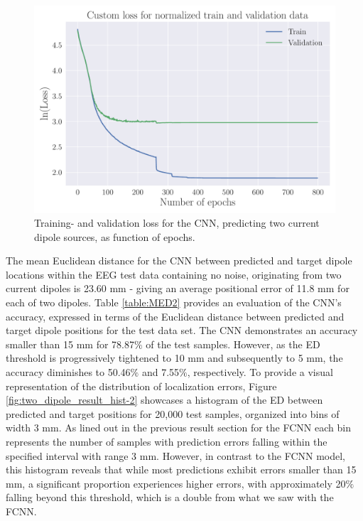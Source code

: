 \documentclass[a4paper, UKenglish, 11pt]{uiomaster}
\begin{document}
\begin{figure}[!htb]
    \centering
    \includegraphics[width=\linewidth]{figures/CNN/Custom_Loss_simple_last_run_old_std_2_dipoles_32_0.001_0.35_0.5_0_800_(0).pdf}
    \caption{Training- and validation loss for the CNN, predicting two current dipole sources, as function of epochs.}
    \label{fig:two_dipole_result_CNN}
\end{figure}

\FloatBarrier

The mean Euclidean distance for the CNN between predicted and target dipole locations within the EEG test data containing no noise, originating from two current dipoles is 23.60 mm - giving an average positional error of 11.8 mm for each of two dipoles. Table \ref{table:MED2} provides an evaluation of the CNN's accuracy, expressed in terms of the Euclidean distance between predicted and target dipole positions for the test data set. The CNN demonstrates an accuracy smaller than 15 mm for 78.87$\%$ of the test samples. However, as the ED threshold is progressively tightened to 10 mm and subsequently to 5 mm, the accuracy diminishes to 50.46$\%$ and 7.55$\%$, respectively. To provide a visual representation of the distribution of localization errors, Figure \ref{fig:two_dipole_result_hist-2} showcases a histogram of the ED between predicted and target positions for 20,000 test samples, organized into bins of width 3 mm. As lined out in the previous result section for the FCNN each bin represents the number of samples with prediction errors falling within the specified interval with range 3 mm. However, in contrast to the FCNN model, this histogram reveals that while most predictions exhibit errors smaller than 15 mm, a significant proportion experiences higher errors, with approximately 20$\%$ falling beyond this threshold, which is a double from what we saw with the FCNN.
\end{document}
